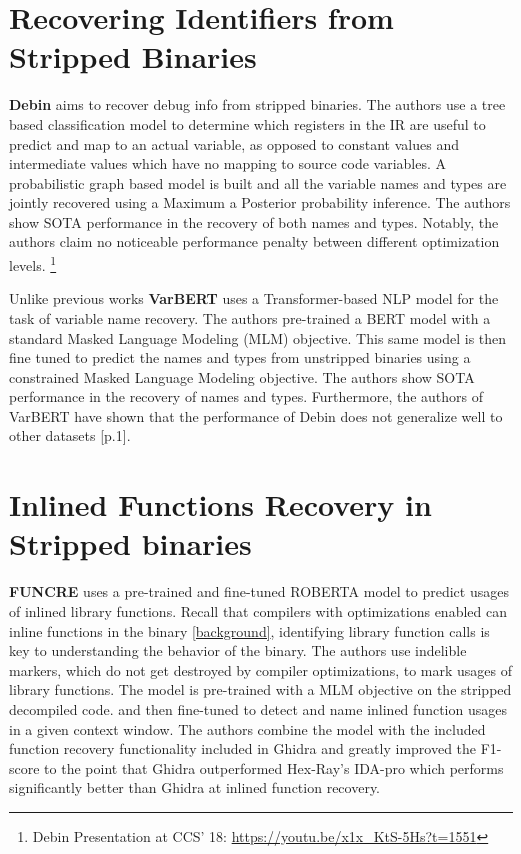 \section{Recovering Identifiers from Stripped Binaries}
\textbf{Debin} \cite{Debin} aims to recover debug info from stripped binaries. The authors use a tree based classification model to determine which registers in the IR are useful to predict and map to an actual variable, as opposed to constant values and intermediate values which have no mapping to source code variables. A probabilistic graph based model is built and all the variable names and types are jointly recovered using a Maximum a Posterior probability inference. The authors show SOTA performance in the recovery of both names and types. Notably, the authors claim no noticeable performance penalty between different optimization levels. \footnote{Debin Presentation at CCS' 18: \url{https://youtu.be/x1x_KtS-5Hs?t=1551}} 

Unlike previous works \textbf{VarBERT} uses a Transformer-based NLP model for the task of variable name recovery. The authors pre-trained a BERT model with a standard Masked Language Modeling (MLM) objective. This same model is then fine tuned to predict the names and types from unstripped binaries using a constrained Masked Language Modeling objective. The authors show SOTA performance in the recovery of names and types. Furthermore, the authors of VarBERT have shown that the performance of Debin does not generalize well to other datasets \cite{VarBERT}[p.1]. 

\section{Inlined Functions Recovery in Stripped binaries}
\textbf{FUNCRE} uses a pre-trained and fine-tuned ROBERTA model to predict usages of inlined library functions. Recall that compilers with optimizations enabled can inline functions in the binary \ref{background}, identifying library function calls is key to understanding the behavior of the binary. The authors use indelible markers, which do not get destroyed by compiler optimizations, to mark usages of library functions. The model is pre-trained with a MLM objective on the stripped decompiled code. and then fine-tuned to detect and name inlined function usages in a given context window. The authors combine the model with the included function recovery functionality included in Ghidra and greatly improved the F1-score to the point that Ghidra outperformed Hex-Ray's IDA-pro which performs significantly better than Ghidra at inlined function recovery. 

